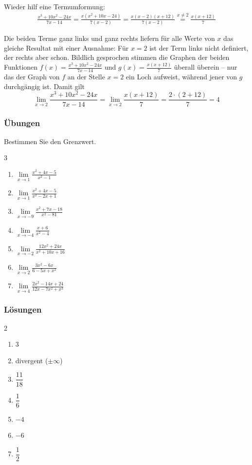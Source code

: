Wieder hilf eine Termumformung:
\begin{align*}
    \frac{x^3+10x^2-24x}{7x-14} = \frac{x(x^2+10x-24)}{7(x-2)} = \frac{x(x-2)(x+12)}{7(x-2)}\stackrel{x\neq 2}{=}\frac{x(x+12)}{7}
\end{align*}

Die beiden Terme ganz links und ganz rechts liefern für alle Werte von $x$ das gleiche Resultat mit einer Ausnahme: Für $x=2$ ist der Term links nicht definiert, der rechts aber schon. Bildlich gesprochen stimmen die Graphen der beiden Funktionen $f(x)=\frac{x^3+10x^2-24x}{7x-14}$ und $g(x)=\frac{x(x+12)}{7}$ überall überein – nur das der Graph von $f$ an der Stelle $x=2$ ein Loch aufweist, während jener von $g$ durchgängig ist.
Damit gilt
$$\lim_{x\rightarrow2} \frac{x^3+10x^2-24x}{7x-14} = \lim_{x\rightarrow2} \frac{x(x+12)}{7} =\frac{2\cdot (2+12)}{7} = 4$$

\subsubsection{Übungen}
Bestimmen Sie den Grenzwert.
\begin{multicols}{3}
    \begin{enumerate}
        \item $\lim\limits_{x \to 1} \frac{x^2 + 4x - 5}{x^2 - 1}$
        \item $\lim\limits_{x \to 1} \frac{x^2 + 4x - 5}{x^2 - 2x + 1}$
        \item $\lim\limits_{x \to -9} \frac{x^2 + 7x - 18}{x^2 - 81}$
        \item $\lim\limits_{x \to -4} \frac{x + 6}{x^2 - 4}$
        \item $\lim\limits_{x \to -2} \frac{12x^2 + 24x}{x^2 + 10x + 16}$
        \item $\lim\limits_{x \to 2} \frac{3x^2 - 6x}{6 - 5x + x^2}$
        \item $\lim\limits_{x \to 4} \frac{2x^2 - 14x + 24}{12x - 7x^2 + x^3}$
    \end{enumerate}
\end{multicols}
\clearpage

\subsubsection*{Lösungen}
\begin{multicols}{2}
    \begin{enumerate}
        \item $3$
        \item divergent ($\pm\infty$)
        \item $\dfrac{11}{18}$
        \item $\dfrac{1}{6}$
        \item $-4$
        \item $-6$
        \item $\dfrac{1}{2}$
    \end{enumerate}
\end{multicols}
\clearpage

